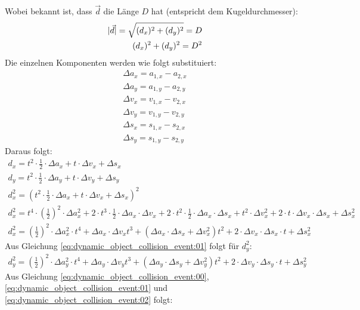 Wobei bekannt ist, dass $\vec{d}$ die Länge $D$ hat (entspricht dem Kugeldurchmesser):
\begin{align}
    \lvert \vec{d} \rvert = \sqrt{(d_x)^2 + (d_y)^2} = D\\
    (d_x)^2 + (d_y)^2 = D^2\label{eq:dynamic_object_collision_event:00}
\end{align}
Die einzelnen Komponenten werden wie folgt substituiert:
\begin{align}
    \Delta a_x = a_{1,x} - a_{2,x}\\
    \Delta a_y = a_{1,y} - a_{2,y}\\
    \Delta v_x = v_{1,x} - v_{2,x}\\
    \Delta v_y = v_{1,y} - v_{2,y}\\
    \Delta s_x = s_{1,x} - s_{2,x}\\
    \Delta s_y = s_{1,y} - s_{2,y}
\end{align}
Daraus folgt:
\begin{align}
    d_x = t^2 \cdot \frac{1}{2} \cdot \Delta a_x + t \cdot \Delta v_x + \Delta s_x\\
    d_y = t^2 \cdot \frac{1}{2} \cdot \Delta a_y + t \cdot \Delta v_y + \Delta s_y\\
    d_x^2 = (t^2 \cdot \frac{1}{2} \cdot \Delta a_x + t \cdot \Delta v_x + \Delta s_x)^2\\
    d_x^2 = t^4 \cdot (\frac{1}{2})^2 \cdot \Delta a_x^2 + 2 \cdot t^3 \cdot \frac{1}{2} \cdot \Delta a_x \cdot \Delta v_x + 2 \cdot t^2 \cdot \frac{1}{2} \cdot \Delta a_x \cdot \Delta s_x  + t^2 \cdot \Delta v_x^2 + 2 \cdot t \cdot \Delta v_x \cdot \Delta s_x + \Delta s_x^2\\
    d_x^2 = (\frac{1}{2})^2 \cdot \Delta a_x^2 \cdot t^4 + \Delta a_x \cdot \Delta v_x t^3 + (\Delta a_x \cdot \Delta s_x + \Delta v_x^2) t^2 + 2 \cdot \Delta v_x \cdot \Delta s_x \cdot t + \Delta s_x^2\label{eq:dynamic_object_collision_event:01}
\end{align}
Aus Gleichung \ref{eq:dynamic_object_collision_event:01} folgt für $d_y^2$:
\begin{align}
    d_y^2 = (\frac{1}{2})^2 \cdot \Delta a_y^2 \cdot t^4 + \Delta a_y \cdot \Delta v_y t^3 + (\Delta a_y \cdot \Delta s_y + \Delta v_y^2) t^2 + 2 \cdot \Delta v_y \cdot \Delta s_y \cdot t + \Delta s_y^2\label{eq:dynamic_object_collision_event:02}
\end{align}
Aus Gleichung \ref{eq:dynamic_object_collision_event:00}, \ref{eq:dynamic_object_collision_event:01} und \ref{eq:dynamic_object_collision_event:02} folgt:
